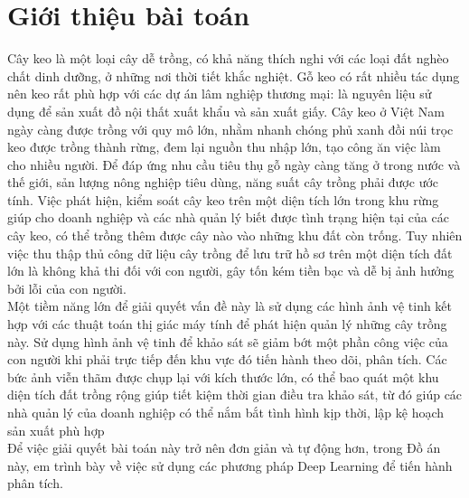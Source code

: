 \documentclass[a4paper, 12pt]{report}
\begin{document}
\section{Giới thiệu bài toán}
\hspace*{1cm} Cây keo là một loại cây dễ trồng, có khả năng thích nghi với các loại đất nghèo chất dinh dưỡng, ở những nơi thời tiết khắc nghiệt. Gỗ keo có rất nhiều tác dụng nên keo rất phù hợp với các dự án lâm nghiệp thương mại: là nguyên liệu sử dụng để sản xuất đồ nội thất xuất khẩu và sản xuất giấy. Cây keo ở Việt Nam ngày càng được trồng với quy mô lớn, nhằm nhanh chóng phủ xanh đồi núi trọc keo được trồng thành rừng, đem lại nguồn thu nhập lớn, tạo công ăn việc làm cho nhiều người. Để đáp ứng nhu cầu tiêu thụ gỗ ngày càng tăng ở trong nước và thế giới, sản lượng nông nghiệp tiêu dùng, năng suất cây trồng phải được ước tính. Việc phát hiện, kiểm soát cây keo trên một diện tích lớn trong khu rừng giúp cho doanh nghiệp và các nhà quản lý biết được tình trạng hiện tại của các cây keo, có thể trồng thêm được cây nào vào những khu đất còn trống. Tuy nhiên việc thu thập thủ công dữ liệu cây trồng để lưu trữ hồ sơ trên một diện tích đất lớn là không khả thi đối với con người, gây tốn kém tiền bạc và dễ bị ảnh hưởng bởi lỗi của con người. \\
\hspace*{1cm} Một tiềm năng lớn để giải quyết vấn đề này là sử dụng các hình ảnh vệ tinh
kết hợp với các thuật toán thị giác máy tính để phát hiện quản lý những cây trồng này. Sử dụng hình ảnh vệ tinh để khảo sát sẽ giảm bớt một phần công việc của con người khi phải trực tiếp đến khu vực đó tiến hành theo dõi, phân tích. Các bức ảnh viễn thãm được chụp lại với kích thước lớn, có thể bao quát một khu diện tích đất trồng rộng giúp tiết kiệm thời gian điều tra khảo sát, từ đó giúp các nhà quản lý của doanh nghiệp có thể nắm bắt tình hình kịp thời, lập kệ hoạch sản xuất phù hợp \\
\hspace*{1cm}Để việc giải quyết bài toán này trở nên đơn giản và tự động hơn, trong Đồ án
này, em trình bày về việc sử dụng các phương pháp Deep Learning để tiến hành phân
tích.
\end{document}
